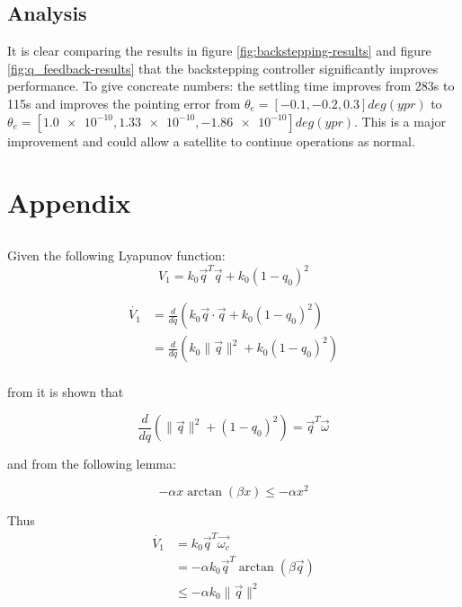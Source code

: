 \subsection{Analysis}
It is clear comparing the results in figure \ref{fig:backstepping-results} and figure \ref{fig:q_feedback-results} that the backstepping controller significantly improves performance. To give concreate numbers: the settling time improves from 283s to 115s and improves the pointing error from $\theta_e = [-0.1, -0.2, 0.3] deg (ypr)$  to $\theta_e = [\num{1.0e-10}, \num{1.33e-10}, \num{-1.86e-10}] deg (ypr)$. This is a major improvement and could allow a satellite to continue operations as normal.

\section{Appendix}
\subsection{}
Given the following Lyapunov function:
$$
V_{1}=k_{0}\vec{q}^T\vec{q}+k_{0}(1-q_{0})^2
$$

\begin{equation}
    \begin{split}
    \dot{V_{1}}&=\frac{d}{dq}(k_{0}\vec{q}\cdot\vec{q}+k_{0}(1-q_{0})^2) \\
    &=\frac{d}{dq}(k_{0}\lVert\vec{q}\rVert^2+k_{0}(1-q_{0})^2) \\
    \end{split}
\end{equation}

from \cite{kimRobustBacksteppingControl2003} it is shown that

\begin{equation}
    \frac{d}{dq}(\lVert \vec{q} \rVert^{2}+(1-q_{0})^2) = \vec{q}^T \vec{\omega}
\end{equation}

and from the following lemma:

\begin{equation}
    -\alpha x \arctan(\beta x) \leq -\alpha x^2
\end{equation}

Thus
\begin{equation}
    \begin{split}
        \dot{V_{1}}&=k_{0}\vec{q}^T\vec{\omega_c} \\
        &= -\alpha k_{0}\vec{q}^T \arctan(\beta \vec{q}) \\
        &\leq -\alpha k_{0} \lVert\vec{q}\rVert^{2}
    \end{split}
\end{equation}

